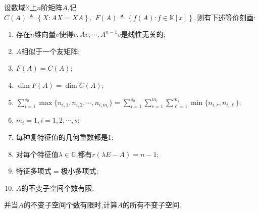 \documentclass[../../main.tex]{subfiles}
\begin{document}
\begin{theorem}[F(A)=C(A)的充要条件和不变子空间刻画]\label{theorem:F(A)=C(A)的充要条件和不变子空间刻画}
设数域$\mathbb{K}$上$n$阶矩阵$A$,记$C\left( A \right) \triangleq \left\{ X:AX=XA \right\},\,\,
F\left( A \right) \triangleq \left\{ f\left( A \right) :f\in \mathbb{K} \left[ x \right] \right\} ,$则有下述等价刻画:
\begin{enumerate}[(1)]
\item 存在$n$维向量$v$使得$v,Av,\cdots,A^{n-1}v$是线性无关的;

\item $A$相似于一个友矩阵;

\item  $F(A)=C(A)$;

\item  $\dim F(A)=\dim C(A)$;

\item $\sum\limits_{i=1}^{s_0}\max\{n_{i,1},n_{i,2},\cdots,n_{i,m_i}\}=\sum\limits_{i=1}^{s_0}\sum\limits_{r=1}^{m_i}\sum\limits_{\ell=1}^{m_i}\min\{n_{i,r},n_{i,\ell}\}$;

\item $m_i=1,i=1,2,\cdots,s$;

\item 每种复特征值的几何重数都是$1$;

\item 对每个特征值$\lambda\in\mathbb{C}$,都有$r(\lambda E-A)=n-1$;

\item 特征多项式$=$极小多项式;

\item $A$的不变子空间个数有限.
\end{enumerate}
并当$A$的不变子空间个数有限时,计算$A$的所有不变子空间.
\end{theorem}
\end{document}

